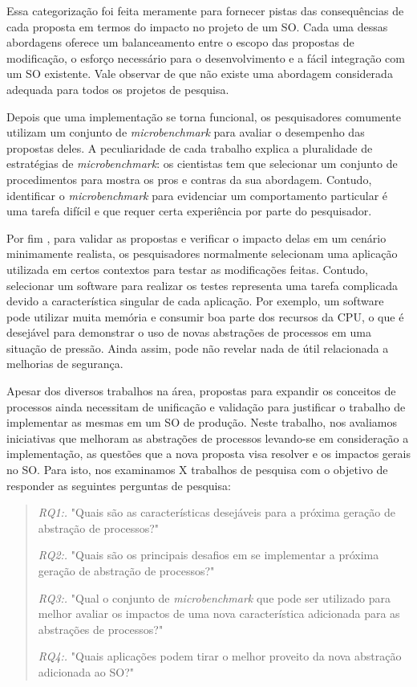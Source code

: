 Essa categorização foi feita meramente para fornecer pistas das consequências
de cada proposta em termos do impacto no projeto de um SO. Cada uma dessas
abordagens oferece um balanceamento entre o escopo das propostas de
modificação, o esforço necessário para o desenvolvimento e a fácil integração
com um SO existente. Vale observar de que não existe uma abordagem considerada
adequada para todos os projetos de pesquisa.

Depois que uma implementação se torna funcional, os pesquisadores comumente
utilizam um conjunto de \emph{microbenchmark} para avaliar o desempenho das
propostas deles. A peculiaridade de cada trabalho explica a pluralidade de
estratégias de \emph{microbenchmark}: os cientistas tem que selecionar um
conjunto de procedimentos para mostra os pros e contras da sua abordagem.
Contudo, identificar o \emph{microbenchmark} para evidenciar um comportamento
particular é uma tarefa difícil e que requer certa experiência por parte do
pesquisador.

Por fim , para validar as propostas e verificar o impacto delas em um cenário
minimamente realista, os pesquisadores normalmente selecionam uma aplicação
utilizada em certos contextos para testar as modificações feitas. Contudo,
selecionar um software para realizar os testes representa uma tarefa complicada
devido a característica singular de cada aplicação. Por exemplo, um software
pode utilizar muita memória e consumir boa parte dos recursos da CPU, o que é
desejável para demonstrar o uso de novas abstrações de processos em uma
situação de pressão. Ainda assim, pode não revelar nada de útil relacionada a
melhorias de segurança.

Apesar dos diversos trabalhos na área, propostas para expandir os conceitos de
processos ainda necessitam de unificação e validação para justificar o trabalho
de implementar as mesmas em um SO de produção. Neste trabalho, nos avaliamos
iniciativas que melhoram as abstrações de processos levando-se em consideração
a implementação, as questões que a nova proposta visa resolver e os impactos
gerais no SO. Para isto, nos examinamos X trabalhos de pesquisa com o objetivo
de responder as seguintes perguntas de pesquisa:

\begin{quote}
 \item \textit{RQ1:.} "Quais são as características desejáveis para a próxima geração de abstração de processos?"
 \item \textit{RQ2:.} "Quais são os principais desafios em se implementar a próxima geração de abstração de processos?"
 \item \textit{RQ3:.} "Qual o conjunto de \emph{microbenchmark} que pode ser utilizado para melhor avaliar os impactos de uma nova característica adicionada para as abstrações de processos?"
 \item \textit{RQ4:.} "Quais aplicações podem tirar o melhor proveito da nova abstração adicionada ao SO?"
\end{quote}

